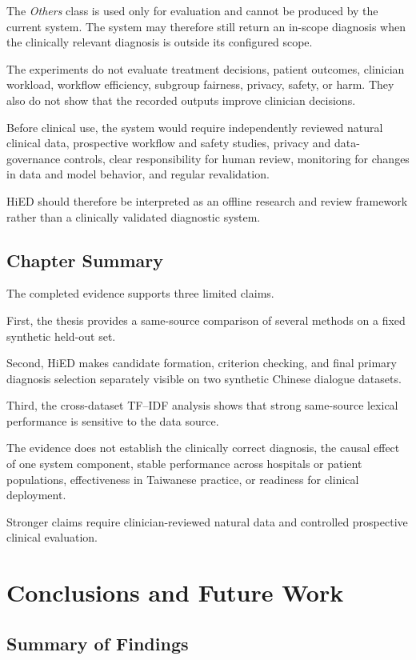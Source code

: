 \documentclass[12pt,a4paper,oneside]{report}
\begin{document}
The \emph{Others} class is used only for evaluation and cannot be
produced by the current system. The system may therefore still return an
in-scope diagnosis when the clinically relevant diagnosis is outside its
configured scope.

The experiments do not evaluate treatment decisions, patient outcomes,
clinician workload, workflow efficiency, subgroup fairness, privacy,
safety, or harm. They also do not show that the recorded outputs improve
clinician decisions.

Before clinical use, the system would require independently reviewed
natural clinical data, prospective workflow and safety studies, privacy
and data-governance controls, clear responsibility for human review,
monitoring for changes in data and model behavior, and regular
revalidation.

HiED should therefore be interpreted as an offline research and review
framework rather than a clinically validated diagnostic system.

\section{Chapter Summary}

The completed evidence supports three limited claims.

First, the thesis provides a same-source comparison of several methods
on a fixed synthetic held-out set.

Second, HiED makes candidate formation, criterion checking, and final
primary diagnosis selection separately visible on two synthetic Chinese
dialogue datasets.

Third, the cross-dataset TF--IDF analysis shows that strong same-source
lexical performance is sensitive to the data source.

The evidence does not establish the clinically correct diagnosis, the
causal effect of one system component, stable performance across
hospitals or patient populations, effectiveness in Taiwanese practice,
or readiness for clinical deployment.

Stronger claims require clinician-reviewed natural data and controlled
prospective clinical evaluation.

\chapter{Conclusions and Future Work}
\label{ch:conclusion}

\section{Summary of Findings}
\end{document}
